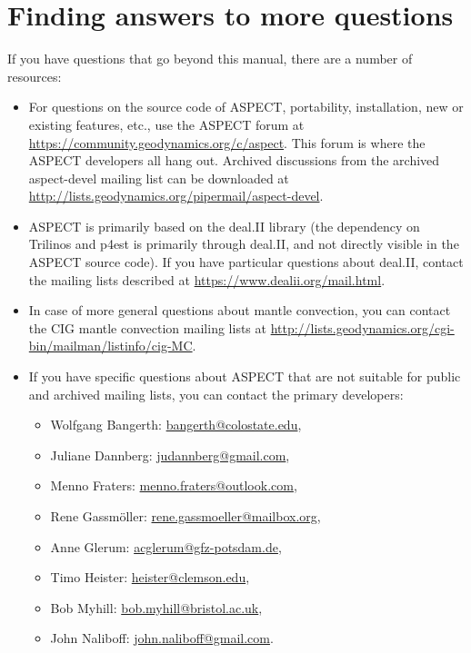 \documentclass{article}
\newcommand{\aspect}{\textsc{ASPECT}}
\begin{document}
\section{Finding answers to more questions}
\label{sec:questions-and-answers}

If you have questions that go beyond this manual, there are a number of
resources:
\begin{itemize}
\item For questions on the source code of \aspect{}, portability, installation, new or existing features,
  etc., use the \aspect{} forum at
  \url{https://community.geodynamics.org/c/aspect}. This
  forum is where the \aspect{} developers all hang out. Archived
  discussions from the archived aspect-devel mailing list can
  be downloaded at \url{http://lists.geodynamics.org/pipermail/aspect-devel}.

\item \aspect{} is primarily based on the deal.II library (the dependency
  on Trilinos and p4est is primarily through deal.II, and not directly
  visible in the \aspect{} source code). If you have particular questions
  about deal.II, contact
  the mailing lists described at \url{https://www.dealii.org/mail.html}.

\item In case of more general questions about mantle convection, you can
  contact the CIG mantle
  convection mailing lists at
  \url{http://lists.geodynamics.org/cgi-bin/mailman/listinfo/cig-MC}.

\item If you have specific questions about \aspect{} that are not suitable
  for public and archived mailing lists, you can contact the
  primary developers:
  \begin{itemize}
  \item Wolfgang Bangerth:
    \url{bangerth@colostate.edu},
  \item Juliane Dannberg:
    \url{judannberg@gmail.com},
  \item Menno Fraters:
    \url{menno.fraters@outlook.com},
  \item Rene Gassm{\"o}ller:
    \url{rene.gassmoeller@mailbox.org},
  \item Anne Glerum:
    \url{acglerum@gfz-potsdam.de},
  \item Timo Heister:
    \url{heister@clemson.edu},
  \item Bob Myhill:
    \url{bob.myhill@bristol.ac.uk},
  \item John Naliboff:
    \url{john.naliboff@gmail.com}.
  \end{itemize}
\end{itemize}
\end{document}
